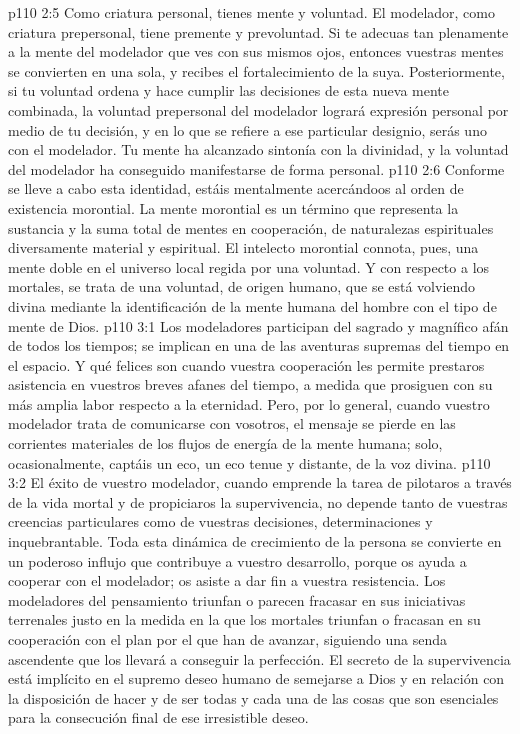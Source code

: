 \vs p110 2:5 \pc Como criatura personal, tienes mente y voluntad. El modelador, como criatura prepersonal, tiene premente y prevoluntad. Si te adecuas tan plenamente a la mente del modelador que ves con sus mismos ojos, entonces vuestras mentes se convierten en una sola, y recibes el fortalecimiento de la suya. Posteriormente, si tu voluntad ordena y hace cumplir las decisiones de esta nueva mente combinada, la voluntad prepersonal del modelador logrará expresión personal por medio de tu decisión, y en lo que se refiere a ese particular designio, serás uno con el modelador. Tu mente ha alcanzado sintonía con la divinidad, y la voluntad del modelador ha conseguido manifestarse de forma personal.
\vs p110 2:6 Conforme se lleve a cabo esta identidad, estáis mentalmente acercándoos al orden de existencia morontial. La mente morontial es un término que representa la sustancia y la suma total de mentes en cooperación, de naturalezas espirituales diversamente material y espiritual. El intelecto morontial connota, pues, una mente doble en el universo local regida por una voluntad. Y con respecto a los mortales, se trata de una voluntad, de origen humano, que se está volviendo divina mediante la identificación de la mente humana del hombre con el tipo de mente de Dios.
\vs p110 3:1 Los modeladores participan del sagrado y magnífico afán de todos los tiempos; se implican en una de las aventuras supremas del tiempo en el espacio. Y qué felices son cuando vuestra cooperación les permite prestaros asistencia en vuestros breves afanes del tiempo, a medida que prosiguen con su más amplia labor respecto a la eternidad. Pero, por lo general, cuando vuestro modelador trata de comunicarse con vosotros, el mensaje se pierde en las corrientes materiales de los flujos de energía de la mente humana; solo, ocasionalmente, captáis un eco, un eco tenue y distante, de la voz divina.
\vs p110 3:2 El éxito de vuestro modelador, cuando emprende la tarea de pilotaros a través de la vida mortal y de propiciaros la supervivencia, no depende tanto de vuestras creencias particulares como de vuestras decisiones, determinaciones y  inquebrantable. Toda esta dinámica de crecimiento de la persona se convierte en un poderoso influjo que contribuye a vuestro desarrollo, porque os ayuda a cooperar con el modelador; os asiste a dar fin a vuestra resistencia. Los modeladores del pensamiento triunfan o parecen fracasar en sus iniciativas terrenales justo en la medida en la que los mortales triunfan o fracasan en su cooperación con el plan por el que han de avanzar, siguiendo una senda ascendente que los llevará a conseguir la perfección. El secreto de la supervivencia está implícito en el supremo deseo humano de semejarse a Dios y en relación con la disposición de hacer y de ser todas y cada una de las cosas que son esenciales para la consecución final de ese irresistible deseo.
